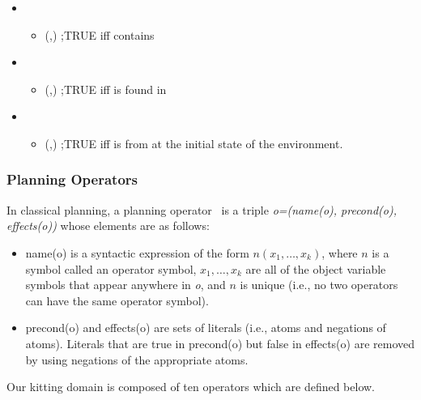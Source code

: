 \begin{itemize}
\item {}
  \begin{itemize}
    \item {}(,) ;TRUE iff  contains 
  \end{itemize}

\item {}
  \begin{itemize}
    \item {}(,) ;TRUE iff  is found in 
  \end{itemize}

\item {}
  \begin{itemize}
    \item {}(,) ;TRUE iff  is from  at the initial state of the environment.
  \end{itemize}
\end{itemize}


\subsubsection{Planning Operators}
 In classical planning, a planning operator~\cite{NAU.2004} is a triple \textit{o=(name(o), precond(o), effects(o))} whose elements are as follows:
\begin{itemize}
\item name(o) is a syntactic expression of the form $n(x_1,\dots,x_k)$, where $n$ is a symbol
called an operator symbol, $x_1,\dots,x_k$ are all of the object variable symbols that
appear anywhere in \textit{o}, and $n$ is unique (i.e., no two operators can have the
same operator symbol).
\item precond(o) and effects(o) are sets of literals (i.e., atoms and negations of atoms). Literals that are true in precond(o) but false in effects(o) are removed by using negations of the appropriate atoms.
\end{itemize}

Our kitting domain is composed of ten operators which are defined below.


